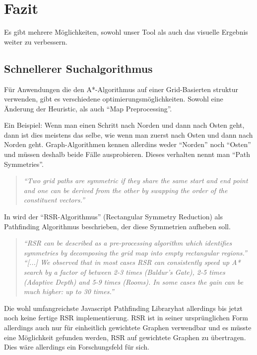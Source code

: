 \documentclass[letterpaper]{article}
\begin{document}
\section{Fazit}
	Es gibt mehrere Möglichkeiten, sowohl unser Tool als auch das visuelle Ergebnis weiter zu verbessern.

	\subsection{Schnellerer Suchalgorithmus}
		Für Anwendungen die den A*-Algorithmus auf einer Grid-Basierten struktur verwenden, gibt es verschiedene optimierungsmöglichkeiten. Sowohl eine Änderung der Heuristic, als auch "`Map Preprocessing"'.

		Ein Beispiel: Wenn man einen Schritt nach Norden und dann nach Osten geht, dann ist dies meistens das selbe, wie wenn man zuerst nach Osten und dann nach Norden geht. Graph-Algorithmen kennen allerdins weder "`Norden"' noch "`Osten"' und müssen deshalb beide Fälle ausprobieren.\cite[vgl.]{patel16} Dieses verhalten nennt man "`Path Symmetries"'.

		\begin{quote}
			\textit{"`Two grid paths are symmetric if they share the same start and end point and one can be derived from the other by swapping the order of the constituent vectors."'}\cite[p. 1]{harabor12}
		\end{quote}

		In \cite{harabor12} wird der "`RSR-Algorithmus"' (Rectangular Symmetry Reduction) als Pathfinding Algorithmus beschrieben, der diese Symmetrien aufheben soll.\\

		\begin{quote}
			\textit{"`RSR can be described as a pre-processing algorithm which identifies symmetries by decomposing the grid map into empty rectangular regions."'}\cite[p. 2]{harabor12}\\

			\textit{"`[...] We observed that in most cases RSR can consistently speed up A* search by a factor of between 2-3 times (Baldur's Gate), 2-5 times (Adaptive Depth) and 5-9 times (Rooms). In some cases the gain can be much higher: up to 30 times."'}\cite[p. 4]{harabor12}
		\end{quote}

		Die wohl umfangreichste Javascript Pathfinding Library\footnotemark hat allerdings bis jetzt noch keine fertige RSR implementierung. RSR ist in seiner ursprünglichen Form allerdings auch nur für einheitlich gewichtete Graphen verwendbar und es müsste eine Möglichkeit gefunden werden, RSR auf gewichtete Graphen zu übertragen. Dies wäre allerdings ein Forschungsfeld für sich.
\end{document}
